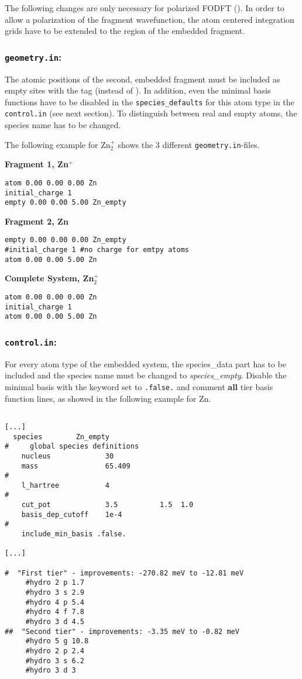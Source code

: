 The following changes are only necessary for polarized FODFT ().
In order to allow a polarization of the fragment wavefunction, the atom centered integration grids have to be extended to the region of the embedded fragment.
\subsubsection*{\texttt{geometry.in}:}
The atomic positions of the second, embedded fragment must be included as empty sites with the tag  (instead of ). In addition, even the minimal basis functions have to be disabled in the \texttt{species\_defaults} for this atom type in the \texttt{control.in} (see next section). To distinguish between real and empty atoms, the species name has to be changed.

The following example for Zn$_2^+$ shows the 3 different \texttt{geometry.in}-files.

\textbf{Fragment 1, Zn$^+$}
\begin{verbatim}
atom 0.00 0.00 0.00 Zn
initial_charge 1
empty 0.00 0.00 5.00 Zn_empty
\end{verbatim}

\textbf{Fragment 2, Zn}
\begin{verbatim}
empty 0.00 0.00 0.00 Zn_empty
#initial_charge 1 #no charge for emtpy atoms
atom 0.00 0.00 5.00 Zn
\end{verbatim}

\textbf{Complete System, Zn$_2^+$}
\begin{verbatim}
atom 0.00 0.00 0.00 Zn
initial_charge 1
atom 0.00 0.00 5.00 Zn
\end{verbatim}

\subsubsection*{\texttt{control.in}:}

For every atom type of the embedded system, the species\_data part has to be included and the species name must be changed to \emph{species\_empty}. Disable the minimal basis with the keyword   set to \texttt{.false.} and comment \textbf{all} tier basis function lines, as showed in the following example for Zn. 

  \begin{verbatim}

[...]
  species        Zn_empty
#     global species definitions
    nucleus             30
    mass                65.409
#
    l_hartree           4
#
    cut_pot             3.5          1.5  1.0
    basis_dep_cutoff    1e-4
#
    include_min_basis .false.

[...]

#  "First tier" - improvements: -270.82 meV to -12.81 meV 
     #hydro 2 p 1.7
     #hydro 3 s 2.9
     #hydro 4 p 5.4
     #hydro 4 f 7.8
     #hydro 3 d 4.5
##  "Second tier" - improvements: -3.35 meV to -0.82 meV
     #hydro 5 g 10.8
     #hydro 2 p 2.4
     #hydro 3 s 6.2
     #hydro 3 d 3
  \end{verbatim}
